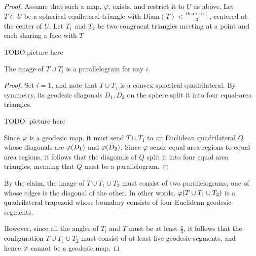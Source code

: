 \begin{proof}
  Assume that such a map, $\varphi$, exists, and restrict 
  it to $U$ as above. Let $T\subset U$ be a 
  spherical equilateral triangle with 
  $\mathrm{Diam}(T)<\frac{\mathrm{Diam}(U)}{3}$, centered at 
  the center of $U$. Let $T_1$ and $T_2$ be two 
  congruent triangles meeting at a point and 
  each sharing a face with $T$
  \begin{center}
    TODO:picture here
  \end{center}
  \begin{claim}
    The image of $T\cup T_i$ is a parallelogram for any $i$.
  \end{claim}
  \begin{proof}
    Set $i=1$, and note that $T\cup T_1$ is a 
    convex spherical quadrilateral. By symmetry, its geodesic 
    diagonals $D_1,D_2$ on the sphere split it into 
    four equal-area triangles.
    \begin{center}
      TODO: picture here
    \end{center}
    Since $\varphi$ is a geodesic map, it must send 
    $T\cup T_1$ to an Euclidean quadrilateral $Q$ whose diagonals 
    are $\varphi(D_1)$ and $\varphi(D_2)$. Since 
    $\varphi$ sends equal area regions to equal area 
    regions, it follows that the diagonals 
    of $Q$ split it into four equal area triangles, meaning 
    that $Q$ must be a parallelogram.
  \end{proof}
  By the claim, the image of $T\cup T_1\cup T_2$ must 
  consist of two parallelograms, one of whose 
  edges is the diagonal of the other. In other words, 
  $\varphi(T\cup T_1\cup T_2)$ is a quadrilateral trapezoid 
  whose boundary consists of four Euclidean geodesic 
  segments.

  However, since all the angles of $T_i$ and $T$ 
  must be at least $\frac{\pi}{3}$, it follows that 
  the configuration $T\cup T_1\cup T_2$ must consist 
  of at least five geodesic segments, and hence 
  $\varphi$ cannot be a geodesic map.
\end{proof}

